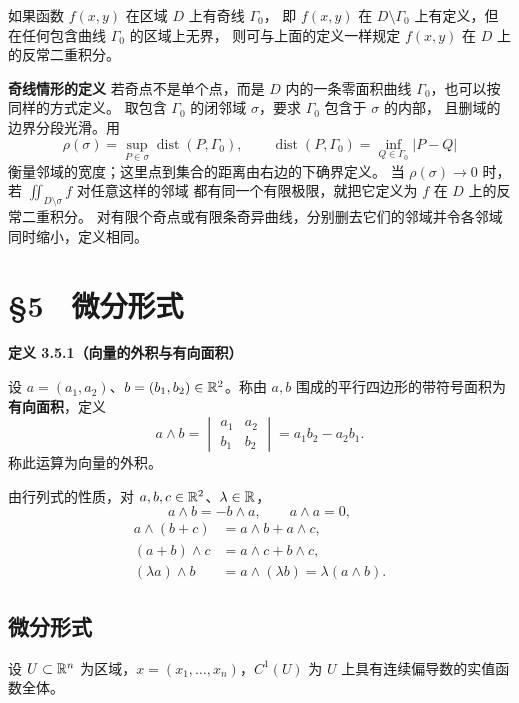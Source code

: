 如果函数 $f(x,y)$ 在区域 $D$ 上有奇线 $\Gamma_0$，
即 $f(x,y)$ 在 $D\setminus\Gamma_0$ 上有定义，但在任何包含曲线 $\Gamma_0$ 的区域上无界，
则可与上面的定义一样规定 $f(x,y)$ 在 $D$ 上的反常二重积分。

\textbf{奇线情形的定义}
若奇点不是单个点，而是 $D$ 内的一条零面积曲线 $\Gamma_0$，也可以按同样的方式定义。
取包含 $\Gamma_0$ 的闭邻域 $\sigma$，要求 $\Gamma_0$ 包含于 $\sigma$ 的内部，
且删域的边界分段光滑。用
\[
\rho(\sigma)=\sup_{P\in\sigma}\operatorname{dist}(P,\Gamma_0),\qquad
\operatorname{dist}(P,\Gamma_0)=\inf_{Q\in\Gamma_0}|P-Q|
\]
衡量邻域的宽度；这里点到集合的距离由右边的下确界定义。
当 $\rho(\sigma)\to0$ 时，若 $\displaystyle\iint_{D\setminus\sigma}f$ 对任意这样的邻域
都有同一个有限极限，就把它定义为 $f$ 在 $D$ 上的反常二重积分。
对有限个奇点或有限条奇异曲线，分别删去它们的邻域并令各邻域同时缩小，定义相同。







\section*{§5　微分形式}



\textbf{定义 3.5.1（向量的外积与有向面积）}


设 $a=(a_1,a_2)$、$b=(b_1,b_2)\in\mathbb{R}^2$。称由 $a,b$ 围成的平行四边形的带符号面积为\textbf{有向面积}，定义
\[
a\wedge b=\begin{vmatrix}a_1&a_2\\b_1&b_2\end{vmatrix}=a_1b_2-a_2b_1.
\]
称此运算为向量的外积。




由行列式的性质，对 $a,b,c\in\mathbb{R}^2$、$\lambda\in\mathbb{R}$，
\[
a\wedge b=-b\wedge a,\qquad a\wedge a=0,
\]
\[
\begin{aligned}
a\wedge(b+c)&=a\wedge b+a\wedge c,\\
(a+b)\wedge c&=a\wedge c+b\wedge c,\\
(\lambda a)\wedge b&=a\wedge(\lambda b)=\lambda(a\wedge b).
\end{aligned}
\]

\subsection*{微分形式}

设 $U\subset\mathbb{R}^n$ 为区域，$x=(x_1,\ldots,x_n)$，$C^1(U)$ 为 $U$ 上具有连续偏导数的实值函数全体。



